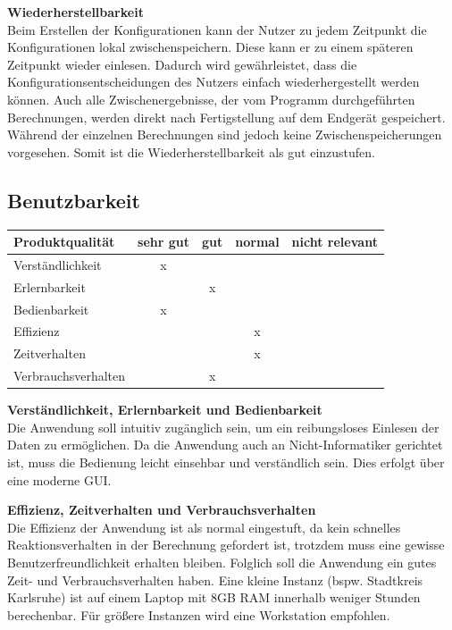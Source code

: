 \documentclass[parskip=full]{scrartcl} %
\begin{document}
\textbf{Wiederherstellbarkeit\\}
Beim Erstellen der Konfigurationen kann der Nutzer zu jedem Zeitpunkt die Konfigurationen lokal zwischenspeichern. Diese kann er zu einem späteren Zeitpunkt wieder einlesen. Dadurch wird gewährleistet, dass die Konfigurationsentscheidungen des Nutzers einfach wiederhergestellt werden können.
Auch alle Zwischenergebnisse, der vom Programm durchgeführten Berechnungen, werden direkt nach Fertigstellung auf dem Endgerät gespeichert. Während der einzelnen Berechnungen sind jedoch keine Zwischenspeicherungen vorgesehen.
Somit ist die Wiederherstellbarkeit als gut einzustufen.


\newpage 


\subsection{Benutzbarkeit}

    \begin{tabular}{|l| c| c| c| c|}
    \hline
        Produktqualität & sehr gut & gut & normal & nicht relevant \\
    \hline
        Verständlichkeit & x & & &\\
    \hline
        Erlernbarkeit & & x & &\\
    \hline
        Bedienbarkeit & x & & &\\
    \hline
        Effizienz & & & x &\\
    \hline
        Zeitverhalten & & & x &\\
    \hline
        Verbrauchsverhalten & & x & &\\
    \hline
    \end{tabular}

\textbf{Verständlichkeit, Erlernbarkeit und Bedienbarkeit}\\
Die Anwendung soll intuitiv zugänglich sein, um ein reibungsloses Einlesen der Daten zu ermöglichen. Da die Anwendung auch an Nicht-Informatiker gerichtet ist, muss die Bedienung leicht einsehbar und verständlich sein. Dies erfolgt über eine moderne GUI.

\textbf{Effizienz, Zeitverhalten und Verbrauchsverhalten}\\
Die Effizienz der Anwendung ist als normal eingestuft, da kein schnelles Reaktionsverhalten in der Berechnung gefordert ist, trotzdem muss eine gewisse Benutzerfreundlichkeit erhalten bleiben. Folglich soll die Anwendung ein gutes Zeit- und Verbrauchsverhalten haben.
Eine kleine Instanz (bspw. Stadtkreis Karlsruhe) ist auf einem Laptop mit 8GB RAM innerhalb weniger Stunden berechenbar. Für größere Instanzen wird eine Workstation empfohlen.
\end{document}

